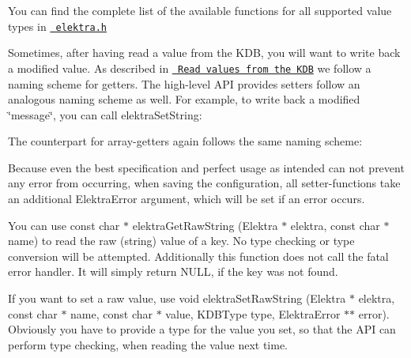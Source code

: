 You can find the complete list of the available functions for all supported value types in \href{/home/mpranj/workspace/libelektra/src/include/elektra.h}{\texttt{ elektra.\+h}}

Sometimes, after having read a value from the K\+DB, you will want to write back a modified value. As described in \href{\#read-values-from-the-kdb}{\texttt{ Read values from the K\+DB}} we follow a naming scheme for getters. The high-\/level A\+PI provides setters follow an analogous naming scheme as well. For example, to write back a modified \char`\"{}message\char`\"{}, you can call {\ttfamily elektra\+Set\+String}\+:


\begin{DoxyCode}{0}
\end{DoxyCode}


The counterpart for array-\/getters again follows the same naming scheme\+:


\begin{DoxyCode}{0}
\end{DoxyCode}


Because even the best specification and perfect usage as intended can not prevent any error from occurring, when saving the configuration, all setter-\/functions take an additional {\ttfamily Elektra\+Error} argument, which will be set if an error occurs.

You can use {\ttfamily const char $\ast$ elektra\+Get\+Raw\+String (Elektra $\ast$ elektra, const char $\ast$ name)} to read the raw (string) value of a key. No type checking or type conversion will be attempted. Additionally this function does not call the fatal error handler. It will simply return {\ttfamily N\+U\+LL}, if the key was not found.

If you want to set a raw value, use {\ttfamily void elektra\+Set\+Raw\+String (Elektra $\ast$ elektra, const char $\ast$ name, const char $\ast$ value, K\+D\+B\+Type type, Elektra\+Error $\ast$$\ast$ error)}. Obviously you have to provide a type for the value you set, so that the A\+PI can perform type checking, when reading the value next time.

